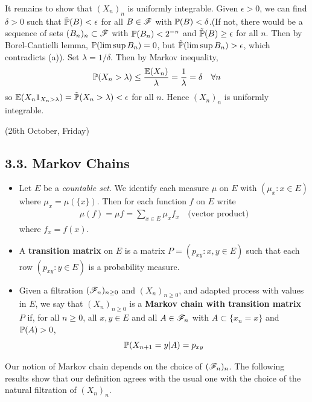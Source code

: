 \documentclass[12pt,a4paper]{report}
\newenvironment{proof}
{\begin{changemargin}{1cm}{0.5cm} 
	}%
	{\end{changemargin}
}
\begin{document}
\begin{proof}
\quad It remains to show that $(X_n)_n$ is uniformly integrable. Given $\epsilon >0$, we can find $\delta >0$ such that $\tilde{\mathbb{P}}(B) <\epsilon$ for all $B \in \mathscr{F}$ with $\mathbb{P} (B) <\delta$.(If not, there would be a sequence of sets $(B_n)_{n} \subset \mathscr{F}$ with $\mathbb{P}(B_n)<2^{-n}$ and $\tilde{\mathbb{P}}(B) \geq \epsilon$ for all $n$. Then by Borel-Cantielli lemma, $\mathbb{P}(\limsup B_n) =0$, but $\tilde{\mathbb{P}}(\limsup B_n) >\epsilon$, which contradicts (a)). Set $\lambda = 1/\delta$. Then by Markov inequality,
\begin{align*}
\mathbb{P}(X_n > \lambda) \leq \frac{\mathbb{E}(X_n)}{\lambda} = \frac{1}{\lambda} = \delta \quad \forall n
\end{align*}
so $\mathbb{E}(X_n 1_{X_n > \lambda}) = \tilde{\mathbb{P}}(X_n > \lambda) < \epsilon$ for all $n$. Hence $(X_n)_n$ is uniformly integrable.

\eop
\end{proof}
\s

\newday

(26th October, Friday)
\s

\subsection*{3.3. Markov Chains}

\begin{itemize}
\item Let $E$ be a \emph{countable set}. We identify each measure $\mu$ on $E$ with $(\mu_x : x\in E)$ where $\mu_x = \mu(\{x\})$. Then for each function $f$ on $E$ write
\begin{align*}
\mu(f) = \mu f = \sum_{x\in E} \mu_x f_x \quad \text{(vector product)}
\end{align*}
where $f_x = f(x)$.
\item A \textbf{transition matrix} on $E$ is a matrix $P=(p_{xy}:x,y\in E)$ such that each row $(p_{xy}:y\in E)$ is a probability measure.
\item Given a filtration $(\mathscr{F}_n)_{n\geq 0}$ and $(X_n)_{n\geq 0}$, and adapted process with values in $E$, we say that $(X_n)_{n\geq 0}$ is a \textbf{Markov chain with transition matrix $P$} if, for all $n\geq 0$, all $x,y\in E$ and all $A\in \mathscr{F}_n$ with $A\subset \{x_n =x \}$ and $\mathbb{P}(A)>0$,
\begin{align*}
\mathbb{P}(X_{n+1} =y |A) = p_{xy}
\end{align*}
\end{itemize}
Our notion of Markov chain depends on the choice of $(\mathscr{F}_n)_n$. The following results show that our definition agrees with the usual one with the choice of the natural filtration of $(X_n)_n$.
\s
\end{document}
